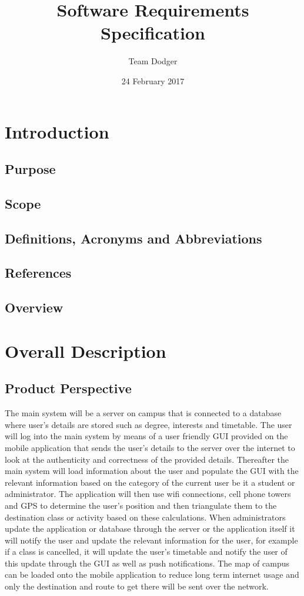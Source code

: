 \documentclass{article}
\title{Software Requirements Specification}
\date{24 February 2017}
\author{Team Dodger}
\begin{document}
	\maketitle
	\newpage
	\tableofcontents
	\newpage
	
	\section{Introduction}
	\subsection{Purpose}
	\subsection{Scope}
	\subsection{Definitions, Acronyms and Abbreviations}
	\subsection{References}
	\subsection{Overview}
	
	\section{Overall Description}
	\subsection{Product Perspective}
	The main system will be a server on campus that is connected to a database where user's details are stored such as degree, interests and timetable. The user will log into the main system by means of a user friendly GUI provided on the mobile application that sends the user's details to the server over the internet to look at the authenticity and correctness of the provided details. Thereafter the main system will load information about the user and populate the GUI with the relevant information based on the category of the current user be it a student or administrator. The application will then use wifi connections, cell phone towers and GPS to determine the user's position and then triangulate them to the destination class or activity based on these calculations. When administrators update the application or database through the server or the application itself it will notify the user and update the relevant information for the user, for example if a class is cancelled, it will update the user's timetable and notify the user of this update through the GUI as well as push notifications. The map of campus can be loaded onto the mobile application to reduce long term internet usage and only the destination and route to get there will be sent over the network.
\end{document}
